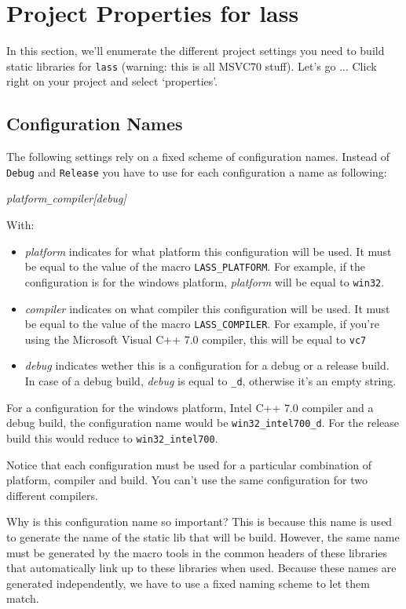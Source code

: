 \documentclass[10pt,a4paper,titlepage,dutch]{report}
\begin{document}
\section{Project Properties for lass}

In this section, we'll enumerate the different project settings
you need to build static libraries for \verb|lass| (warning: this
is all MSVC70 stuff). Let's go ... Click right on your project and
select `properties'.

\subsection{Configuration Names}

The following settings rely on a fixed scheme of configuration
names.  Instead of \verb|Debug| and \verb|Release| you have to use
for each configuration a name as following:

\emph{platform}\verb|_|\emph{compiler}\emph{[debug]}

With:
\begin{itemize}
  \item \emph{platform} indicates for what platform this
configuration will be used.  It must be equal to the value of the
macro \verb|LASS_PLATFORM|.  For example, if the configuration is
for the windows platform, \emph{platform} will be equal to
\verb|win32|.
  \item \emph{compiler} indicates on what compiler this
  configuration will be used.  It must be equal to the value of
  the macro \verb|LASS_COMPILER|.  For example, if you're using
  the Microsoft Visual C++ 7.0 compiler, this will be equal to
  \verb|vc7|
  \item \emph{debug} indicates wether this is a configuration
  for a debug or a release build.  In case of a debug build,
  \emph{debug} is equal to \verb|_d|, otherwise it's an empty
  string.
\end{itemize}

For a configuration for the windows platform, Intel C++ 7.0
compiler and a debug build, the configuration name would be
\verb|win32_intel700_d|.  For the release build this would reduce
to \verb|win32_intel700|.

Notice that each configuration must be used for a particular
combination of platform, compiler and build. You can't use the
same configuration for two different compilers.

Why is this configuration name so important?  This is because this
name is used to generate the name of the static lib that will be
build.  However, the same name must be generated by the macro
tools in the common headers of these libraries that automatically
link up to these libraries when used.  Because these names are
generated independently, we have to use a fixed naming scheme to
let them match.
\end{document}
